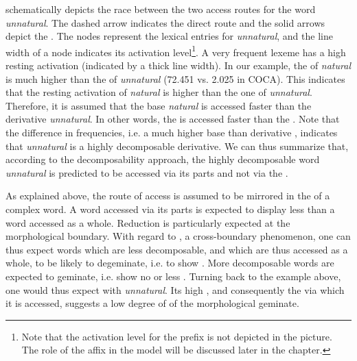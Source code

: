  schematically depicts the race between the two access routes for the word \textit{unnatural}. The dashed arrow indicates the direct route and the solid arrows depict the . The nodes represent the lexical entries for \textit{unnatural}, and the line width of a node indicates its activation level\footnote{Note that the activation level for the prefix  is not depicted in the picture. The role of the affix in the model will be discussed later in the chapter.}. A very frequent lexeme has a high resting activation (indicated by a thick line width). In our example, the  of \textit{natural} is much higher than the  of \textit{unnatural} (72.451 vs. 2.025 in  {COCA}). This indicates that the resting activation of \textit{natural} is higher than the one of \textit{unnatural}. Therefore, it is assumed that the base \textit{natural} is accessed faster than the derivative \textit{unnatural}. In other words, the  is accessed faster than the . Note that the difference in frequencies, i.e. a much higher base  than derivative , indicates that \textit{unnatural} is a highly decomposable derivative. We can thus summarize that, according to the decomposability approach, the highly decomposable word \textit{unnatural} is predicted to be accessed via its parts and not via the .


As explained above, the route of access is assumed to be mirrored in the  of a complex word. A word accessed via its parts is expected to display less  than a word accessed as a whole. Reduction is particularly expected at the morphological boundary. With regard to , a cross-boundary phenomenon, one can thus expect words which are less decomposable, and which are thus accessed as a whole, to be likely to degeminate, i.e. to show . More decomposable words are expected to geminate, i.e. show no or less . 
Turning back to the example above, one would thus expect  with \textit{unnatural}. Its high , and consequently the  via which it is accessed, suggests a low degree of  of the morphological geminate.


